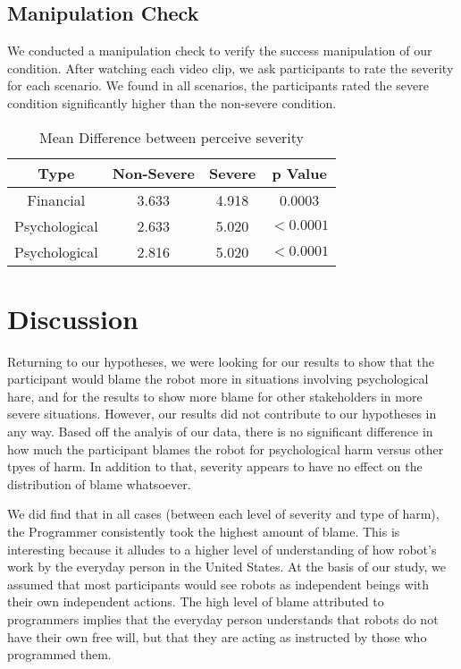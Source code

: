 \documentclass{sigchi}
\begin{document}
\subsection{Manipulation Check}
We conducted a manipulation check to verify the success manipulation of our condition. After watching each video clip, we ask participants to rate the severity for each scenario. We found in all scenarios, the participants rated the severe condition significantly higher than the non-severe condition.

\begin{table}
  \centering
  \begin{tabular}{|c|c|c|c|}
    \hline
    Type & Non-Severe & Severe & p Value \\
    \hline
    Financial & 3.633 & 4.918 & 0.0003 \\
    \hline
    Psychological & 2.633 & 5.020 & $ < 0.0001$ \\
    \hline
    Psychological & 2.816 & 5.020 & $ < 0.0001$ \\
    \hline
  \end{tabular}
  \caption{Mean Difference between perceive severity}
  \label{tab:table1}
\end{table}



\section{Discussion}
Returning to our hypotheses, we were looking for our results to show that the participant would blame the robot more in situations involving psychological hare, and for the results to show more blame for other stakeholders in more severe situations. However, our results did not contribute to our hypotheses in any way. Based off the analyis of our data, there is no significant difference in how much the participant blames the robot for psychological harm versus other tpyes of harm. In addition to that, severity appears to have no effect on the distribution of blame whatsoever.

We did find that in all cases (between each level of severity and type of harm), the Programmer consistently took the highest amount of blame. This is interesting because it alludes to a higher level of understanding of how robot's work by the everyday person in the United States. At the basis of our study, we assumed that most participants would see robots as independent beings with their own independent actions. The high level of blame attributed to programmers implies that the everyday person understands that robots do not have their own free will, but that they are acting as instructed by those who programmed them. 
\end{document}
